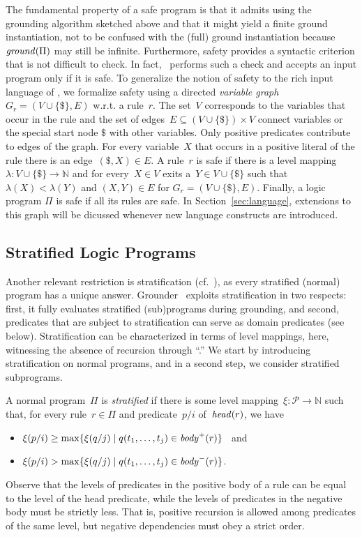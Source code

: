 \begin{newstuff}
The fundamental property of a safe
program is that it admits using the grounding algorithm sketched above 
and that it might yield a finite ground instantiation, not to be confused with
the (full) ground instantiation because $\mathit{ground}(\Pi)$ may still be infinite.
Furthermore, safety provides a syntactic criterion that is not
difficult to check.
In fact, \gringo\ performs such a check and accepts an input program only if it is safe.
To generalize the notion of safety to the rich input language of \gringo,
we formalize safety using a directed \emph{variable graph} $G_r=(V \cup \{\$\},E)$
w.r.t. a rule~$r$.
The set~$V$ corresponds to the variables that occur in the rule and
the set of edges~$E \subseteq (V \cup \{\$\}) \times V$ connect variables 
or the special start node $\$$ with other variables.
Only positive predicates contribute to edges of the graph.
For every variable~$X$ that occurs in a positive literal of the rule there is an edge~$(\$,X)\in E$.
A rule~$r$ is safe if there is a level mapping $\lambda:V\cup\{\$\}\rightarrow\mathbb{N}$ 
and for every~$X \in V$ exits a~$Y \in V\cup\{\$\}$ 
such that $\lambda(X) < \lambda(Y)$ and $(X,Y) \in E$ for $G_r=(V \cup \{\$\}, E)$.
Finally, a logic program $\Pi$ is safe if all its rules are safe.
In Section~\ref{sec:language}, extensions to this graph will be dicussed
whenever new language constructs are introduced.
\end{newstuff}

\subsection{Stratified Logic Programs}\label{subsec:strat}

Another relevant restriction is stratification (cf.~\cite{minker88}),
as every stratified (normal) program has a unique answer.
Grounder \gringo\ exploits stratification in two respects:
first, it fully evaluates stratified (sub)programs during grounding, and second,
predicates that are subject to stratification can serve as domain predicates (see below).
Stratification can be characterized in terms
of level mappings, here, witnessing the absence of recursion through ``.''
We start by introducing stratification on normal programs, and in a second step,
we consider stratified subprograms.

A normal program~$\Pi$ is \emph{stratified}
if there is some level mapping~$\xi:\mathcal{P}\rightarrow\mathbb{N}$ such that,
for every rule~$r\in\Pi$ and predicate~$p/i$ of~$\mathit{head}(r)$, we have
\begin{itemize}
\item
$\xi(p/i)\geq\max\{\xi(q/j) \mid q(t_1,\dots,t_j)\in\mathit{body}^+(r)\}$ ~and
\item
$\xi(p/i)>   \max\{\xi(q/j) \mid q(t_1,\dots,t_j)\in\mathit{body}^-(r)\}$.
\end{itemize}
%
Observe that the levels of predicates in the positive body of a rule
can be equal to the level of the head predicate,
while the levels of predicates in the negative body must be strictly less.
That is, positive recursion is allowed among predicates of the same level,
but negative dependencies must obey a strict order.

